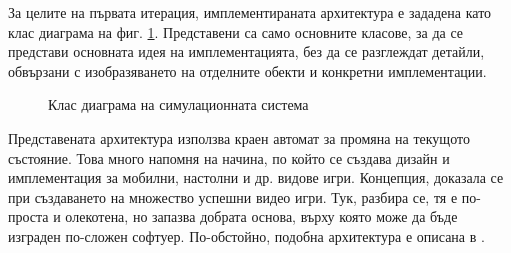 		За целите на първата итерация, имплементираната архитектура е зададена като клас диаграма на фиг. \ref{figure:simulation-class-diagram}.
		Представени са само основните класове, за да се представи основната идея на имплементацията, без
		да се разглеждат детайли, обвързани с изобразяването на отделните обекти и конкретни имплементации.
		
		\begin{figure}
			\caption{Клас диаграма на симулационната система}
			\label{figure:simulation-class-diagram}
				\begin{center}
				\end{center}
		\end{figure}
		
		\newpage
		
		Представената архитектура използва краен автомат за промяна на текущото състояние.
		Това много напомня на начина, по който се създава дизайн и имплементация за мобилни, настолни
		и др. видове игри. Концепция, доказала се при създаването на множество успешни видео игри. 
		Тук, разбира се, тя е по-проста и олекотена, но запазва добрата основа, 
		върху която може да бъде изграден по-сложен софтуер. По-обстойно, подобна архитектура е описана в \cite{Rollings}.
		

